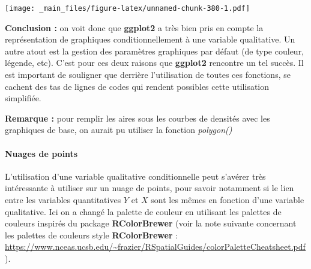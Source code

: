\documentclass[
]{book}
\theoremstyle{definition}
\theoremstyle{definition}
\theoremstyle{definition}
\theoremstyle{definition}
\theoremstyle{remark}
\begin{document}
\texttt{[image: \_main\_files/figure-latex/unnamed-chunk-380-1.pdf]}

\textbf{Conclusion :} on voit donc que \textbf{ggplot2} a très bien pris en compte la représentation de graphiques conditionnellement à une variable qualitative. Un autre atout est la gestion des paramètres graphiques par défaut (de type couleur, légende, etc). C'est pour ces deux raisons que \textbf{ggplot2} rencontre un tel succès. Il est important de souligner que derrière l'utilisation de toutes ces fonctions, se cachent des tas de lignes de codes qui rendent possibles cette utilisation simplifiée.

\textbf{Remarque :} pour remplir les aires sous les courbes de densités avec les graphiques de base, on aurait pu utiliser la fonction \emph{polygon()}

\hypertarget{nuages-de-points}{%
\paragraph{Nuages de points}\label{nuages-de-points}}

L'utilisation d'une variable qualitative conditionnelle peut s'avérer très intéressante à utiliser sur un nuage de points, pour savoir notamment si le lien entre les variables quantitatives \(Y\) et \(X\) sont les mêmes en fonction d'une variable qualitative. Ici on a changé la palette de couleur en utilisant les palettes de couleurs inspirés du package \textbf{RColorBrewer} (voir la note suivante concernant les palettes de couleurs style \textbf{RColorBrewer} : \url{https://www.nceas.ucsb.edu/~frazier/RSpatialGuides/colorPaletteCheatsheet.pdf}).
\end{document}
